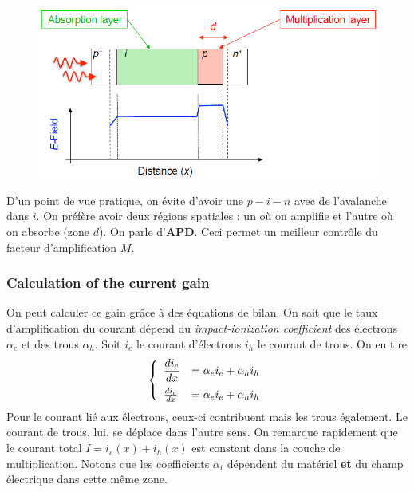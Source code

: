 \begin{figure}
\vspace{-5mm}
\includegraphics[scale=0.25]{ch5/image7}
\end{figure}
D'un point de vue pratique, on évite d'avoir une $p-i-n$ avec de l'avalanche dans $i$. On préfère
avoir deux régions spatiales : un où on amplifie et l'autre où on absorbe (zone $d$). On parle
 d'\textbf{APD}. Ceci permet un meilleur contrôle du facteur d'amplification $M$.
 
\subsubsection{Calculation of the current gain}
On peut calculer ce gain grâce à des équations de bilan. On sait que le taux d'amplification du
courant dépend du \textit{impact-ionization coefficient} des électrons $\alpha_e$ et des
trous $\alpha_h$. Soit $i_e$ le courant d'électrons $i_h$ le courant de trous. On en tire
\begin{equation}
\left\{\begin{array}{ll}
\DS\frac{{d{i_e}}}{{dx}} &\DS= {\alpha _e}{i_e} + {\alpha _h}{i_h}\vspace{2mm}\\
\frac{{d{i_e}}}{{dx}} &\DS= {\alpha _e}{i_e} + {\alpha _h}{i_h}
\end{array}\right.
\end{equation}
Pour le courant lié aux électrons, ceux-ci contribuent mais les trous également. Le courant de 
trous, lui, se déplace dans l'autre sens. On remarque rapidement que le courant total 
$I=i_e(x)+i_h(x)$ est constant dans la couche de multiplication. Notons que les coefficients 
$\alpha_i$ dépendent du matériel \textbf{et} du champ électrique dans cette même zone.

